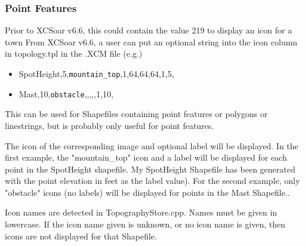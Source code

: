 \subsubsection{Point Features}
Prior to XCSoar v6.6, this could contain the value 219 to display an icon for a town
From XCSoar v6.6, a user can put an optional string into the icon column in topology.tpl in the .XCM file (e.g.)
\begin{itemize}
\item SpotHeight,5,\texttt{mountain\_top},1,64,64,64,1,5,
\item Mast,10,\texttt{obstacle},,,,,1,10,
\end{itemize}
This can be used for Shapefiles containing point features or polygons or linestrings, but is probably only useful for point features.

The icon of the corresponding image and optional label will be displayed. In the first example, 
the "mountain\_top" icon and a label will be displayed for each point in the SpotHeight shapefile. My
SpotHeight Shapefile has been generated with the point elevation in feet as the label value). For the second example, only "obstacle" icons 
(no labels) will be displayed for points in the Mast Shapefile..

Icon names are detected in TopographyStore.cpp. Names must be given in lowercase. If the icon name given is unknown, or no icon name is given, then icons are not displayed for that Shapefile.


